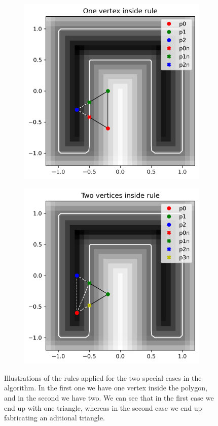 \documentclass[acmtog]{acmart}
\begin{document}
\begin{figure}[H]
  \centering
  \begin{subfigure}{0.22\textwidth}
    \centering
    \includegraphics[width=\textwidth]{Images/one_inside_rule.png}
  \end{subfigure}
  \begin{subfigure}{0.22\textwidth}
    \includegraphics[width=\textwidth]{Images/two_inside_rule.png}
    \centering
  \end{subfigure}\hfill
  \caption{Illustrations of the rules applied for the two special cases in the algorithm. In the first one we have one vertex inside the polygon, and in the second we have two. We can see that in the first case we end up with one triangle, whereas in the second case we end up fabricating an aditional triangle.}
\end{figure}
\end{document}

